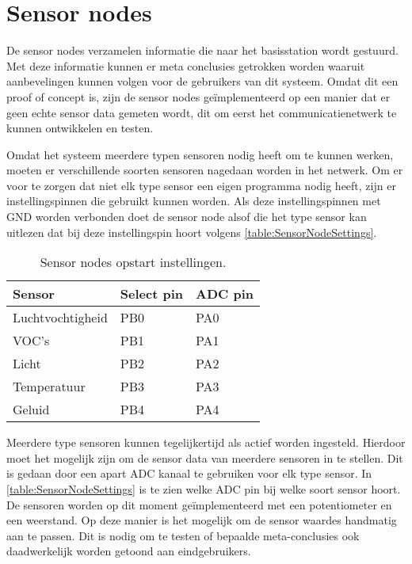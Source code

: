 \section{Sensor nodes} \label{sec:dummyData}

De sensor nodes verzamelen informatie die naar het basisstation wordt gestuurd. Met deze informatie kunnen er meta conclusies getrokken worden waaruit aanbevelingen kunnen volgen voor de gebruikers van dit systeem. Omdat dit een proof of concept is, zijn de sensor nodes geïmplementeerd op een manier dat er geen echte sensor data gemeten wordt, dit om eerst het communicatienetwerk te kunnen ontwikkelen en testen. 

Omdat het systeem meerdere typen sensoren nodig heeft om te kunnen werken, moeten er verschillende soorten sensoren nagedaan worden in het netwerk. Om er voor te zorgen dat niet elk type sensor een eigen programma nodig heeft, zijn er instellingspinnen die gebruikt kunnen worden.
Als deze instellingspinnen met GND worden verbonden doet de sensor node alsof die het type sensor kan uitlezen dat bij deze instellingspin hoort volgens \autoref{table:SensorNodeSettings}.
\begin{table}[h]
    \centering
    \begin{tabular}{l|l|l}      
        \textbf{Sensor}     & \textbf{Select pin}   & \textbf{ADC pin}  \\\hline
        Luchtvochtigheid    & PB0                   & PA0               \\\hline
        VOC's               & PB1                   & PA1               \\\hline
        Licht                & PB2                   & PA2               \\\hline
        Temperatuur         & PB3                   & PA3               \\\hline
        Geluid              & PB4                   & PA4
    \end{tabular}
    \caption{Sensor nodes opstart instellingen.}
    \label{table:SensorNodeSettings}
\end{table}
Meerdere type sensoren kunnen tegelijkertijd als actief worden ingesteld. Hierdoor moet het mogelijk zijn om de sensor data van meerdere sensoren in te stellen. Dit is gedaan door een apart ADC kanaal te gebruiken voor elk type sensor. In \autoref{table:SensorNodeSettings} is te zien welke ADC pin bij welke soort sensor hoort. De sensoren worden op dit moment geïmplementeerd met een potentiometer en een weerstand. Op deze manier is het mogelijk om de sensor waardes handmatig aan te passen. Dit is nodig om te testen of bepaalde meta-conclusies ook daadwerkelijk worden getoond aan eindgebruikers.

